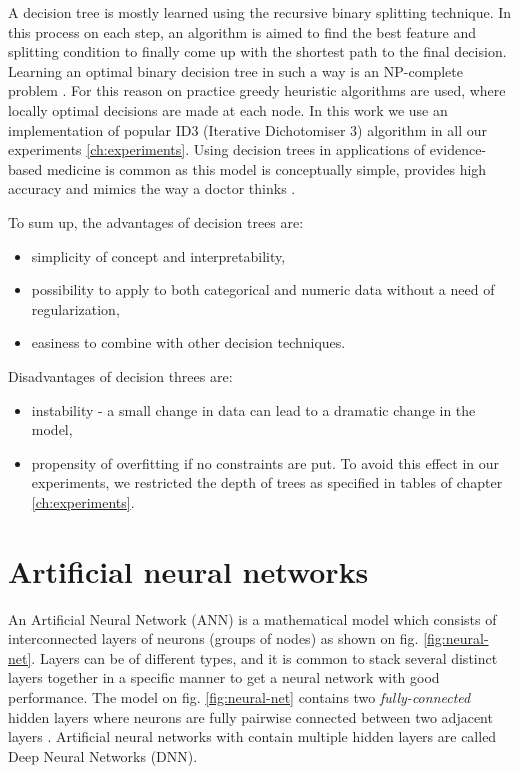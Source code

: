 A decision tree is mostly learned using the recursive binary splitting technique. In this process on each step, an algorithm is aimed to find the best feature and splitting condition to finally come up with the shortest path to the final decision.
Learning an optimal binary decision tree in such a way is an NP-complete problem \citep{Hyafil-1976}. For this reason on practice greedy heuristic algorithms are used, where locally optimal decisions are made at each node. In this work we use an implementation of popular ID3 (Iterative Dichotomiser 3) algorithm \citep{Quinlan-1986} in all our experiments \ref{ch:experiments}. Using decision trees in applications of evidence-based medicine is common as this model is conceptually simple, provides high accuracy and mimics the way a doctor thinks \citep{Sackett-1996, Podgorelec-2002}. 

To sum up, the advantages of decision trees are:
\begin{itemize}
    \item simplicity of concept and interpretability,
    \item possibility to apply to both categorical and numeric data without a need of regularization,
    \item easiness to combine with other decision techniques.
\end{itemize}

Disadvantages of decision threes are:
\begin{itemize}
    \item instability - a small change in data can lead to a dramatic change in the model,
    \item propensity of overfitting if no constraints are put. To avoid this effect in our experiments, we restricted the depth of trees as specified in tables of chapter \ref{ch:experiments}.
\end{itemize}


\section{Artificial neural networks}
An Artificial Neural Network (ANN) is a mathematical model which consists of interconnected layers of neurons (groups of nodes) as shown on fig. \ref{fig:neural-net}. Layers can be of different types, and it is common to stack several distinct layers together in a specific manner to get a neural network with good performance. The model on fig. \ref{fig:neural-net} contains two \textit{fully-connected} hidden layers where neurons are fully pairwise connected between two adjacent layers \citep{FeiFei-2016}. Artificial neural networks with contain multiple hidden layers are called Deep Neural Networks (DNN). 

